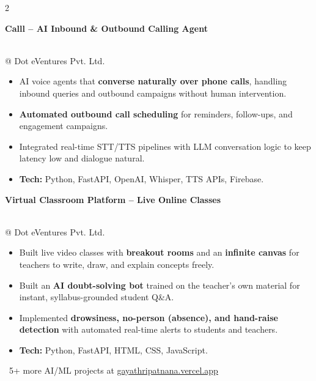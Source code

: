 \documentclass[10pt, a4paper]{article}
\newcommand{\pentry}[3]{%
  \noindent
  \begin{minipage}[t]{0.70\linewidth}
    {\small\textbf{\color{accent}#1}}
  \end{minipage}\hfill%
  \begin{minipage}[t]{0.28\linewidth}
    \raggedleft{\footnotesize\color{mutedtext}#2}
  \end{minipage}\\[1pt]%
  {\footnotesize\color{mutedtext}#3}%
  \vspace{1pt}%
}
\begin{document}
\begin{paracol}{2}
\vspace{2pt}
\pentry{Calll -- AI Inbound \& Outbound Calling Agent}{2026}{@ Dot eVentures Pvt. Ltd.}
\begin{itemize}
  \item AI voice agents that \textbf{converse naturally over phone calls}, handling inbound queries and outbound campaigns without human intervention.
  \item \textbf{Automated outbound call scheduling} for reminders, follow-ups, and engagement campaigns.
  \item Integrated real-time STT/TTS pipelines with LLM conversation logic to keep latency low and dialogue natural.
  \item \textbf{Tech:} Python, FastAPI, OpenAI, Whisper, TTS APIs, Firebase.
\end{itemize}

\vspace{2pt}
\pentry{Virtual Classroom Platform -- Live Online Classes}{2026}{@ Dot eVentures Pvt. Ltd.}
\begin{itemize}
  \item Built live video classes with \textbf{breakout rooms} and an \textbf{infinite canvas} for teachers to write, draw, and explain concepts freely.
  \item Built an \textbf{AI doubt-solving bot} trained on the teacher's own material for instant, syllabus-grounded student Q\&A.
  \item Implemented \textbf{drowsiness, no-person (absence), and hand-raise detection} with automated real-time alerts to students and teachers.
  \item \textbf{Tech:} Python, FastAPI, HTML, CSS, JavaScript.
\end{itemize}

{\footnotesize\color{mutedtext}\faLink\ 5+ more AI/ML projects at
\href{https://gayathripatnana.vercel.app}{gayathripatnana.vercel.app}}

\end{paracol}
\end{document}
